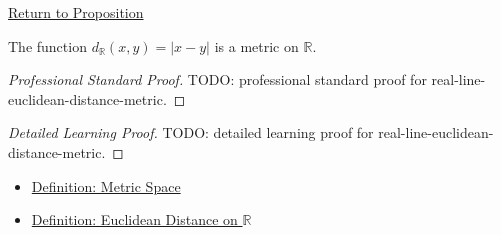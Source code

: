 \newpage
{}
\label{prf:real-line-euclidean-distance-metric}

\begin{remark*}[Return]
\hyperref[prop:real-line-euclidean-distance-metric]{Return to Proposition}
\end{remark*}

\begin{proposition*}
The function \(d_{\mathbb{R}}(x,y)=|x-y|\) is a metric on \(\mathbb{R}\).
\end{proposition*}

\begin{proof}[Professional Standard Proof]
\LRAProofBodyStart
TODO: professional standard proof for real-line-euclidean-distance-metric.
\end{proof}

\begin{proof}[Detailed Learning Proof]
\LRAProofBodyStart
TODO: detailed learning proof for real-line-euclidean-distance-metric.
\end{proof}

\begin{remark*}
\end{remark*}

\begin{dependencies}
\begin{itemize}
  \item \hyperref[def:metric-space]{Definition: Metric Space}
  \item \hyperref[def:real-line-euclidean-distance]{Definition: Euclidean Distance on \(\mathbb{R}\)}
\end{itemize}
\end{dependencies}

\clearpage
